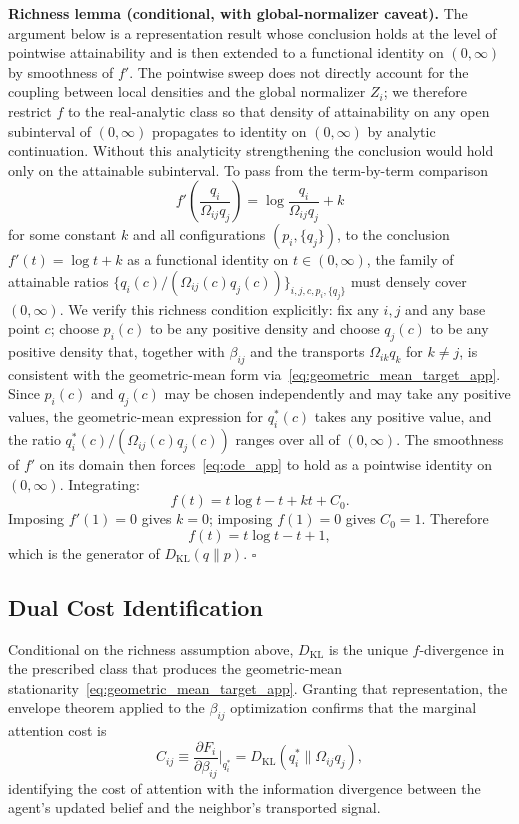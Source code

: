 \documentclass[11pt]{article}
\begin{document}
\textbf{Richness lemma (conditional, with global-normalizer caveat).} The argument below is a representation result whose conclusion holds at the level of pointwise attainability and is then extended to a functional identity on $(0, \infty)$ by smoothness of $f'$. The pointwise sweep does not directly account for the coupling between local densities and the global normalizer $Z_i$; we therefore restrict $f$ to the real-analytic class so that density of attainability on any open subinterval of $(0, \infty)$ propagates to identity on $(0, \infty)$ by analytic continuation. Without this analyticity strengthening the conclusion would hold only on the attainable subinterval. To pass from the term-by-term comparison
\begin{equation}
f'\left(\frac{q_i}{\Omega_{ij}q_j}\right) = \log\frac{q_i}{\Omega_{ij}q_j} + k
\label{eq:ode_app}
\end{equation}
for some constant $k$ and all configurations $(p_i, \{q_j\})$, to the conclusion $f'(t) = \log t + k$ as a functional identity on $t \in (0, \infty)$, the family of attainable ratios $\{q_i(c)/(\Omega_{ij}(c)q_j(c))\}_{i,j,c,p_i,\{q_j\}}$ must densely cover $(0, \infty)$. We verify this richness condition explicitly: fix any $i, j$ and any base point $c$; choose $p_i(c)$ to be any positive density and choose $q_j(c)$ to be any positive density that, together with $\beta_{ij}$ and the transports $\Omega_{ik}q_k$ for $k \neq j$, is consistent with the geometric-mean form via~\eqref{eq:geometric_mean_target_app}. Since $p_i(c)$ and $q_j(c)$ may be chosen independently and may take any positive values, the geometric-mean expression for $q_i^*(c)$ takes any positive value, and the ratio $q_i^*(c)/(\Omega_{ij}(c)q_j(c))$ ranges over all of $(0, \infty)$. The smoothness of $f'$ on its domain then forces~\eqref{eq:ode_app} to hold as a pointwise identity on $(0, \infty)$. Integrating:
\[
f(t) = t\log t - t + kt + C_0.
\]
Imposing $f'(1)=0$ gives $k=0$; imposing $f(1)=0$ gives $C_0 = 1$. Therefore
\[
f(t) = t\log t - t + 1,
\]
which is the generator of $D_{\mathrm{KL}}(q\|p)$. \hfill $\square$

\subsection*{Dual Cost Identification}
Conditional on the richness assumption above, $D_{\mathrm{KL}}$ is the unique $f$-divergence in the prescribed class that produces the geometric-mean stationarity~\eqref{eq:geometric_mean_target_app}. Granting that representation, the envelope theorem applied to the $\beta_{ij}$ optimization confirms that the marginal attention cost is
\begin{equation}
C_{ij} \equiv \frac{\partial F_i}{\partial\beta_{ij}}\bigg|_{q_i^*}
= D_{\mathrm{KL}}(q_i^*\|\Omega_{ij}q_j),
\end{equation}
identifying the cost of attention with the information divergence between the agent's updated belief and the neighbor's transported signal.
\end{document}

